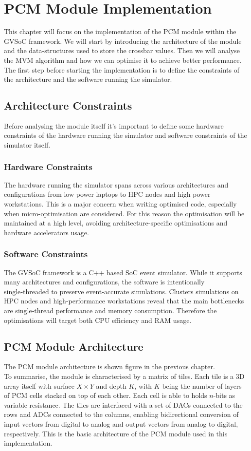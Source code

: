 \chapter{PCM Module Implementation}\label{chap:module}
This chapter will focus on the implementation of the PCM module within the GVSoC framework.
We will start by introducing the architecture of the module and the data-structures used to store the crossbar values.
Then we will analyse the MVM algorithm and how we can optimise it to achieve better performance.\\
The first step before starting the implementation is to define the constraints of the architecture and the software running the simulator.
\section{Architecture Constraints}\label{sec:arch_const}
Before analysing the module itself it's important to define some hardware constraints of the hardware running the simulator and software constraints of the simulator itself.
\subsection{Hardware Constraints}\label{sec:hw_const}
The hardware running the simulator spans across various architectures and configurations from low power laptops to HPC nodes and high power workstations.
This is a major concern when writing optimised code, especially when micro-optimisation are considered.
For this reason the optimisation will be maintained at a high level, avoiding architecture-specific optimisations and hardware accelerators usage.
\subsection{Software Constraints}\label{sec:sw_const}
The GVSoC framework is a C++ based SoC event simulator. While it supports many architectures and configurations, the software is intentionally single‑threaded to preserve event‑accurate simulations.
Clusters simulations on HPC nodes and high‑performance workstations reveal that the main bottlenecks are single‑thread performance and memory consumption. Therefore the optimisations will target both CPU efficiency and RAM usage.

\section{PCM Module Architecture}\label{sec:module_arch}
The PCM module architecture is shown figure  in the previous chapter.\\
To summarise, the module is characterised by a matrix of tiles. Each tile is a 3D array itself with surface $X \times Y$ and depth $K$, with $K$ being the 
number of layers of PCM cells stacked on top of each other. Each cell is able to holds $n$-bits as variable resistance.
The tiles are interfaced with a set of DACs connected to the rows and ADCs connected to the columns, enabling bidirectional conversion of input vectors from digital to analog and output vectors from analog to digital, respectively.
This is the basic architecture of the PCM module used in this implementation.
